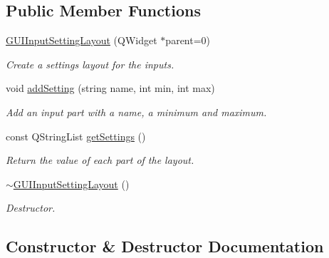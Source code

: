\subsection*{Public Member Functions}
\begin{DoxyCompactItemize}
\item 
\mbox{\hyperlink{class_g_u_i_input_setting_layout_aba21bb530dc924d463ee3bb22e525244}{G\+U\+I\+Input\+Setting\+Layout}} (Q\+Widget $\ast$parent=0)
\begin{DoxyCompactList}\small\item\em Create a settings layout for the inputs. \end{DoxyCompactList}\item 
void \mbox{\hyperlink{class_g_u_i_input_setting_layout_ac1bb93144f1301a145ce4497bafa1791}{add\+Setting}} (string name, int min, int max)
\begin{DoxyCompactList}\small\item\em Add an input part with a name, a minimum and maximum. \end{DoxyCompactList}\item 
\mbox{\label{class_g_u_i_input_setting_layout_ae1f03910bca19090beeecb741955dd7b}} 
const Q\+String\+List \mbox{\hyperlink{class_g_u_i_input_setting_layout_ae1f03910bca19090beeecb741955dd7b}{get\+Settings}} ()
\begin{DoxyCompactList}\small\item\em Return the value of each part of the layout. \end{DoxyCompactList}\item 
\mbox{\hyperlink{class_g_u_i_input_setting_layout_a266755dd96c70a4059966d5a419c891b}{$\sim$\+G\+U\+I\+Input\+Setting\+Layout}} ()
\begin{DoxyCompactList}\small\item\em Destructor. \end{DoxyCompactList}\end{DoxyCompactItemize}


\subsection{Constructor \& Destructor Documentation}
\mbox{\label{class_g_u_i_input_setting_layout_aba21bb530dc924d463ee3bb22e525244}} 
